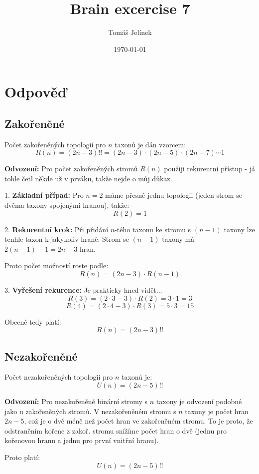 \documentclass{article}
\title{Brain excercise 7}
\author{Tomáš Jelínek}
\date{\today}
\begin{document}
\maketitle

\section*{Odpověď}

\subsection*{Zakořeněné}

Počet zakořeněných topologií pro \(n\) taxonů je dán vzorcem:
\[
R(n) = (2n - 3)!! = (2n-3) \cdot (2n-5) \cdot (2n-7) \cdots 1
\]

\textbf{Odvození:} 
Pro počet zakořeněných stromů \(R(n)\) použiji rekurentní přístup - já tohle četl někde už v prváku, takže nejde o můj důkaz.

1. \textbf{Základní případ:} Pro \(n = 2\) máme přesně jednu topologii (jeden strom se dvěma taxony spojenými hranou), takže:
   \[
   R(2) = 1
   \]

2. \textbf{Rekurentní krok:} Při přidání \(n\)-tého taxonu ke stromu s \((n-1)\) taxony lze tenhle taxon k jakykoliv hraně. Strom se \((n-1)\) taxony má \(2(n-1) - 1 = 2n - 3\) hran.

   Proto počet možností roste podle:
   \[
   R(n) = (2n - 3) \cdot R(n-1)
   \]

3. \textbf{Vyřešení rekurence:} Je prakticky hned vidět...
   \[
   R(3) = (2 \cdot 3 - 3) \cdot R(2) = 3 \cdot 1 = 3
   \]
   \[
   R(4) = (2 \cdot 4 - 3) \cdot R(3) = 5 \cdot 3 = 15
   \]
   
   Obecně tedy platí:
   \[
   R(n) = (2n - 3)!! 
   \]

\subsection*{Nezakořeněné}
Počet nezakořeněných topologií pro \(n\) taxonů je:
\[
U(n) = (2n - 5)!!
\]

\textbf{Odvození:} 
Pro nezakořeněné binární stromy s \(n\) taxony je odvození podobné jako u zakořeněných stromů. V nezakořeněném stromu s \(n\) taxony je počet hran \(2n - 5\), což je o dvě méně než počet hran ve zakořeněném stromu. To je proto, že odstraněním kořene z zakoř. stromu snížíme počet hran o dvě (jednu pro kořenovou hranu a jednu pro první vnitřní hranu).


Proto platí:
\[
U(n) = (2n - 5)!! 
\]
\end{document}
